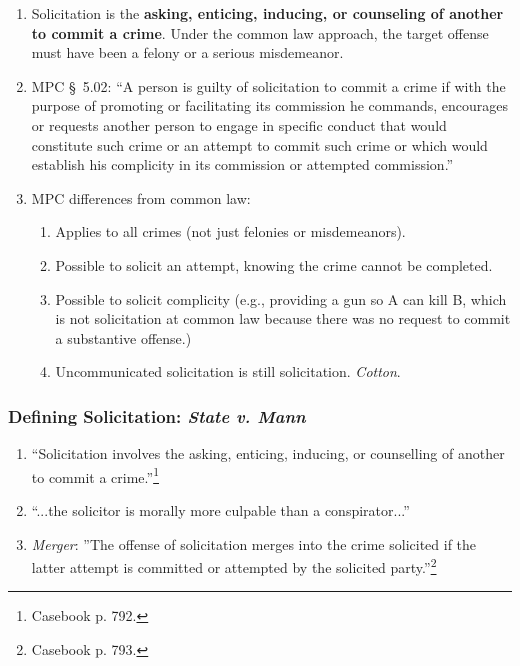 \begin{enumerate}
    \item Solicitation is the \textbf{asking, enticing, inducing, or 
    counseling of another to commit a crime}. Under the common law approach, 
    the {target offense must have been a felony or a serious misdemeanor}.
    \item MPC \S\ 5.02: ``A person is guilty of solicitation to commit a crime 
    if with the purpose of promoting or facilitating its commission he 
    commands, encourages or requests another person to engage in specific 
    conduct that would constitute such crime or an attempt to commit such 
    crime or which would establish his complicity in its commission or 
    attempted commission.''
    \item MPC differences from common law:
    \begin{enumerate}
        \item Applies to all crimes (not just felonies or misdemeanors).
        \item Possible to solicit an attempt, knowing the crime cannot be completed.
        \item Possible to solicit complicity (e.g., providing a gun so A can 
        kill B, which is not solicitation at common law because there was no 
        request to commit a substantive offense.)
        \item Uncommunicated solicitation is still solicitation. \emph{Cotton}.
    \end{enumerate}
\end{enumerate}

\subsubsection{Defining Solicitation: \emph{State v. Mann}}

\begin{enumerate}
    \item ``Solicitation involves the asking, enticing, inducing, or 
    counselling of another to commit a crime.''\footnote{Casebook p. 792.}
    \item ``...the solicitor is morally more culpable than a conspirator...''
    \item \emph{Merger}: ''The offense of solicitation merges into the crime 
    solicited if the latter attempt is committed or attempted by the solicited 
    party.''\footnote{Casebook p. 793.}
\end{enumerate}

